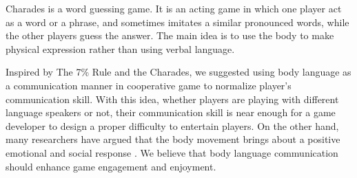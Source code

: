 Charades\cite{GD3} is a word guessing game. It is an acting game in which one player act as a word or a phrase, and sometimes imitates a similar pronounced words, while the other players guess the answer. The main idea is to use the body to make physical expression rather than using verbal language. 

Inspired by The 7\% Rule and the Charades, we suggested using body language as a communication manner in cooperative game to normalize player's communication skill. With this idea, whether players are playing with different language speakers or not, their communication skill is near enough for a game developer to design a proper difficulty to entertain players. On the other hand, many researchers have argued that the body movement brings about a positive emotional and social response \cite{GD7, GD8, GD9}. We believe that body language communication should enhance game engagement and enjoyment.
